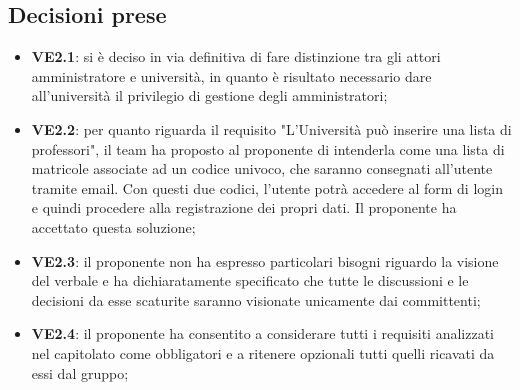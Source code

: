 	\subsection{Decisioni prese}
		\begin{itemize}
			\item \textbf{VE2.1}: si è deciso in via definitiva di fare distinzione tra gli attori amministratore e università, in quanto è risultato necessario dare all'università il privilegio di gestione degli amministratori;
			\item \textbf{VE2.2}: per quanto riguarda il requisito "L'Università può inserire una lista di professori", il team ha proposto al proponente di intenderla come una lista di matricole associate ad un codice univoco, che saranno consegnati all'utente tramite email. Con questi due codici, l'utente potrà accedere al form di login e quindi procedere alla registrazione dei propri dati. Il proponente ha accettato questa soluzione;
			\item \textbf{VE2.3}: il proponente non ha espresso particolari bisogni riguardo la visione del verbale e ha dichiaratamente specificato che tutte le discussioni e le decisioni da esse scaturite saranno visionate unicamente dai committenti;
			\item \textbf{VE2.4}: il proponente ha consentito a considerare tutti i requisiti analizzati nel capitolato come obbligatori e a ritenere opzionali tutti quelli ricavati da essi dal gruppo;
		\end{itemize}